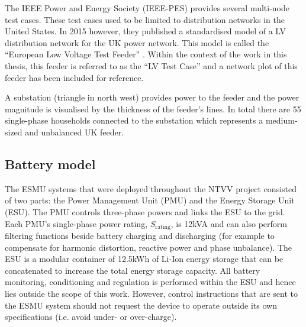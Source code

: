 The IEEE Power and Energy Society (IEEE-PES) provides several multi-node test cases.
These test cases used to be limited to distribution networks in the United States.
In 2015 however, they published a standardised model of a LV distribution network for the UK power network.
This model is called the ``European Low Voltage Test Feeder'' \cite{DistributionTestFeeders2017}.
Within the context of the work in this thesis, this feeder is referred to as the ``LV Test Case'' and a network plot of this feeder has been included for reference.



A substation (triangle in north west) provides power to the feeder and the power magnitude is visualised by the thickness of the feeder's lines.
In total there are 55 single-phase households connected to the substation which represents a medium-sized and unbalanced UK feeder.

\subsection{Battery model}
\label{ch1:subsec:battery-model}


The ESMU systems that were deployed throughout the NTVV project consisted of two parts: the Power Management Unit (PMU) and the Energy Storage Unit (ESU).
The PMU controls three-phase powers and links the ESU to the grid.
Each PMU's single-phase power rating, $S_\text{rating}$, is 12kVA and can also perform filtering functions beside battery charging and discharging (for example to compensate for harmonic distortion, reactive power and phase unbalance).
The ESU is a modular container of 12.5kWh of Li-Ion energy storage that can be concatenated to increase the total energy storage capacity.
All battery monitoring, conditioning and regulation is performed within the ESU and hence lies outside the scope of this work.
However, control instructions that are sent to the ESMU system should not request the device to operate outside its own specifications (i.e. avoid under- or over-charge).

\nomenclature[I]{$\eta$}{Round-trip efficiency of power electronics, where $\eta \in (0, 1]$}

